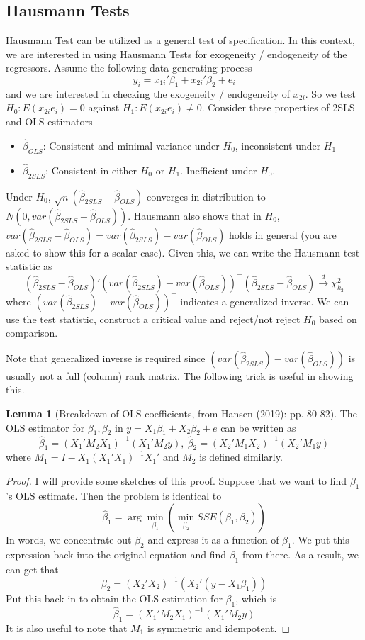 \documentclass[12pt]{article}
\theoremstyle{definition}
\theoremstyle{property}
\theoremstyle{assumption}
\theoremstyle{example}
\theoremstyle{comment}
\newtheorem{lemma}[theorem]{Lemma}
\begin{document}
\subsection{Hausmann Tests}
Hausmann Test can be utilized as a general test of specification. In this context, we are interested in using Hausmann Tests for exogeneity / endogeneity of the regressors. Assume the following data generating process
\[
y_i = x_{1i}'\beta_1 + x_{2i}'\beta_2+e_i
\]
and we are interested in checking the exogeneity / endogeneity of $x_{2i}$. So we test $H_0: E(x_{2i}e_i)=0$ against $H_1:E(x_{2i}e_i)\neq0$. Consider these properties of 2SLS and OLS estimators
\begin{itemize}
\item $\hat{\beta}_{OLS}$: Consistent and minimal variance under $H_0$, inconsistent under $H_1$
\item $\hat{\beta}_{2SLS}$:  Consistent in either $H_0$ or $H_1$. Inefficient under $H_0$. 
\end{itemize}
Under $H_0$, $\sqrt{n}(\hat{\beta}_{2SLS}-\hat{\beta}_{OLS})$ converges in distribution to $N(0, var(\hat{\beta}_{2SLS}-\hat{\beta}_{OLS}))$. Hausmann also shows that in $H_0$, $var(\hat{\beta}_{2SLS}-\hat{\beta}_{OLS})=var(\hat{\beta}_{2SLS})-var(\hat{\beta}_{OLS})$ holds in general (you are asked to show this for a scalar case). Given this, we can write the Hausmann test statistic as 
\[
(\hat{\beta}_{2SLS}-\hat{\beta}_{OLS})'(var(\hat{\beta}_{2SLS})-var(\hat{\beta}_{OLS}))^-(\hat{\beta}_{2SLS}-\hat{\beta}_{OLS})\xrightarrow{d}\chi_{k_2}^2
\]
where $(var(\hat{\beta}_{2SLS})-var(\hat{\beta}_{OLS}))^-$ indicates a generalized inverse. We can use the test statistic, construct a critical value and reject/not reject $H_0$ based on comparison.\par
Note that  generalized inverse is required since $(var(\hat{\beta}_{2SLS})-var(\hat{\beta}_{OLS}))$ is usually not a full (column) rank matrix. The following trick is useful in showing this.
\begin{mdframed}[backgroundcolor=blue!5] 
\begin{lemma}[Breakdown of OLS coefficients, from Hansen (2019): pp. 80-82]
The OLS estimator for $\beta_1, \beta_2$ in $y=X_1\beta_1 + X_2\beta_2+e$ can be written as
\[
\hat{\beta}_1=(X_1'M_2X_1)^{-1}(X_1'M_2y),\ \hat{\beta}_2=(X_2'M_1X_2)^{-1}(X_2'M_1y)
\]
where $M_1 = I-X_1(X_1'X_1)^{-1}X_1'$ and $M_2$ is defined similarly.
\begin{proof}
I will provide some sketches of this proof. Suppose that we want to find $\beta_1$'s OLS estimate. Then the problem is identical to
\[
\hat{\beta}_1 = \arg\min_{\beta_1}(\min_{\beta_2}SSE(\beta_1, \beta_2))
\]
In words, we concentrate out $\beta_2$ and express it as a function of $\beta_1$. We put this expression back into the original equation and find $\beta_1$ from there. As a result, we can get that
\[
\beta_2 = (X_2'X_2)^{-1}(X_2'(y-X_1\beta_1))
\]
Put this back in to obtain the OLS estimation for $\beta_1$, which is
\[
\hat{\beta}_1=(X_1'M_2X_1)^{-1}(X_1'M_2y)
\]
It is also useful to note that $M_1$ is symmetric and idempotent. 
\end{proof}
\end{lemma}
\end{mdframed}
\end{document}
